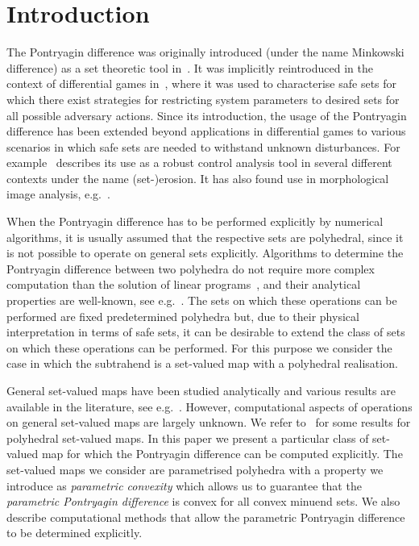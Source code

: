 \documentclass[smallextended]{svjour3}       %
\numberwithin{equation}{section}
\begin{document}

\section{Introduction}
%
The Pontryagin difference was originally introduced (under the 
name Minkowski difference) as a set theoretic tool
in~\cite{Hadwiger:1950,Hadwiger:1957}. 
%
It was implicitly reintroduced in the context of
differential games in~\cite{Pontryagin:1966}, where it was used to characterise safe sets for which there exist strategies for restricting system parameters to desired sets for all possible adversary actions.
%
Since its introduction, the usage of the Pontryagin difference has been extended beyond applications in differential games to various scenarios in which safe sets are needed to withstand unknown disturbances.
%
For example~\cite{blanchini:2007} describes its use as a robust
control analysis tool in several different contexts under the name
(set-)erosion. It has also found use in morphological image analysis, e.g.~\cite{Haralick:1987}.
%

When the Pontryagin difference has to be performed explicitly by numerical algorithms, it is usually assumed that the respective sets are polyhedral, since it is not possible to operate on general sets explicitly.
%
Algorithms to determine the Pontryagin difference between two
polyhedra do not require more complex computation than the solution of
linear programs~\cite{Kolmanovsky:1998,Kerrigan:2003}, and their
analytical properties are well-known, see e.g.~\cite{blanchini:2007,Haralick:1987,Kolmanovsky:1998}.
%
The sets on which these operations can be performed are fixed
predetermined polyhedra but, due to their physical interpretation in
terms of safe sets, it can be desirable to extend the class of sets on which these operations can be performed.
%
For this purpose we consider the case in which the subtrahend is a
set-valued map with a polyhedral realisation.

General set-valued maps have been studied analytically and various results are available in the literature, see e.g.~\cite{Aubin:2009}.
%
However, computational aspects of operations on general set-valued
maps are largely unknown. We refer to~\cite{Finzel:2000} for some results for polyhedral set-valued maps.
%
In this paper we present a particular class of set-valued map for which the Pontryagin difference can be computed explicitly.
%
The set-valued maps we consider are parametrised polyhedra with a property we introduce as \emph{parametric convexity} which allows us to guarantee that the \emph{parametric Pontryagin difference} is convex for all convex minuend sets.
%
We also describe computational methods that allow the parametric Pontryagin difference to be determined explicitly.
\end{document}
